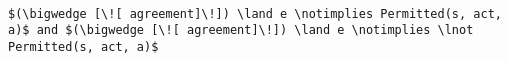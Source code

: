 \lstset{mathescape, language=AST} 
\begin{lstlisting}[frame=single, caption={Answerable Queries: Not Applicable},label={lst:notapplicabledecision}]

$(\bigwedge [\![ agreement]\!]) \land e \notimplies Permitted(s, act, a)$ and $(\bigwedge [\![ agreement]\!]) \land e \notimplies \lnot Permitted(s, act, a)$

\end{lstlisting}





















